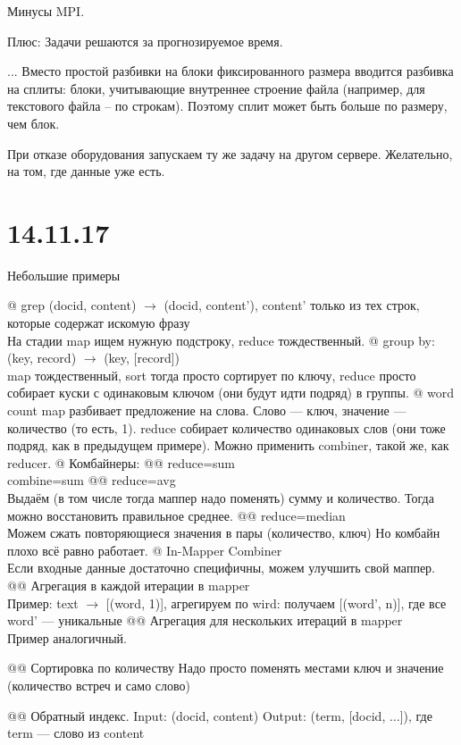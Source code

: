 Минусы MPI.

Плюс: Задачи решаются за прогнозируемое время.


...
Вместо простой разбивки на блоки фиксированного размера вводится разбивка на сплиты: блоки, учитывающие внутреннее строение файла (например, для текстового файла -- по строкам). Поэтому сплит может быть больше по размеру, чем блок.

При отказе оборудования запускаем ту же задачу на другом сервере. Желательно, на том, где данные уже есть. 

\section{14.11.17}
Небольшие примеры
\begin{el}[ul]
@ grep (docid, content) $\to$ (docid, content'), content' только из тех строк, которые содержат искомую фразу \\ 
На стадии map ищем нужную подстроку, reduce тождественный.
@ group by: (key, record) $\to$ (key, [record])\\
map тождественный, sort тогда просто сортирует по ключу, reduce просто собирает куски с одинаковым ключом (они будут идти подряд) в группы.
@ word count
map разбивает предложение на слова. Слово --- ключ, значение --- количество (то есть, 1). 
reduce собирает количество одинаковых слов (они тоже подряд, как в предыдущем примере).
Можно применить combiner, такой же, как reducer.
@ Комбайнеры: 
@@ reduce=sum \\
combine=sum
@@ reduce=avg \\
Выдаём (в том числе тогда маппер надо поменять) сумму и количество. Тогда можно восстановить правильное среднее.
@@ reduce=median \\
Можем сжать повторяющиеся значения в пары (количество, ключ)
Но комбайн плохо всё равно работает.
@ In-Mapper Combiner\\
Если входные данные достаточно специфичны, можем улучшить свой маппер.
@@ Агрегация в каждой итерации в mapper\\
Пример:
text $\to$ [(word, 1)], агрегируем по wird: получаем [(word', n)], где все word' --- уникальные
@@ Агрегация для нескольких итераций в mapper\\
Пример аналогичный.

@@ Сортировка по количеству
Надо просто поменять местами ключ и значение (количество встреч и само слово)

@@ Обратный индекс.
Input: (docid, content)
Output: (term, [docid, $\dots$]), где term --- слово из content


\end{el}

